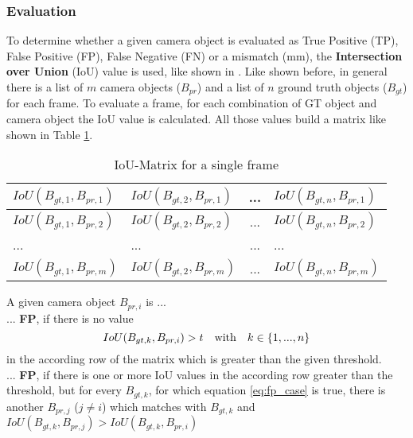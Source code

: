 

\subsubsection{Evaluation}
\label{sssec:eval}
To determine whether a given camera object is evaluated as True Positive (TP), False Positive (FP), False Negative (FN) or a mismatch (mm), the \textbf{Intersection over Union} (IoU) value is used, like shown in \cite{Reway}. 
Like shown before, in general there is a list of $m$ camera objects ($B_{pr}$) and a list of $n$ ground truth objects ($B_{gt}$) for each frame. To evaluate a frame, for each combination of GT object and camera object the IoU value is calculated. All those values build a matrix like shown in Table \ref{tab:matrix}.
\begin{table}[h]
	\caption{IoU-Matrix for a single frame}
	\begin{tabularx}{\columnwidth}{X|X|c|X}
		\toprule
		$IoU(B_{gt,1}, B_{pr,1})$ & $IoU(B_{gt,2}, B_{pr,1})$ & ... & $IoU(B_{gt,n}, B_{pr,1})$ \\
		\midrule
		$IoU(B_{gt,1}, B_{pr,2})$ & $IoU(B_{gt,2}, B_{pr,2})$ & ... & $IoU(B_{gt,n}, B_{pr,2})$ \\
		\midrule
		... & ... & ... & ... \\
		\midrule		
		$IoU(B_{gt,1}, B_{pr,m})$ & $IoU(B_{gt,2}, B_{pr,m})$ & ... & $IoU(B_{gt,n}, B_{pr,m})$ \\
		\bottomrule
	\end{tabularx}
	\label{tab:matrix}
\end{table}

A given camera object $B_{pr,i}$ is ... \\

... \textbf{FP}, if there is no value 
\begin{equation}
	IoU(B_{gt,k}, B_{pr,i}) > t \text{\quad with\quad} k \in \left\lbrace 1, ..., n\right\rbrace 
	\label{eq:fp_case}
\end{equation}
in the according row of the matrix which is greater than the given threshold. \\

... \textbf{FP}, if there is one or more IoU values in the according row greater than the threshold, but for every $B_{gt,k}$, for which equation \ref{eq:fp_case} is true, there is another $B_{pr,j}$ ($j\neq i$) which matches with $B_{gt,k}$ and $IoU(B_{gt,k}, B_{pr,j}) > IoU(B_{gt,k}, B_{pr,i})$ \\

